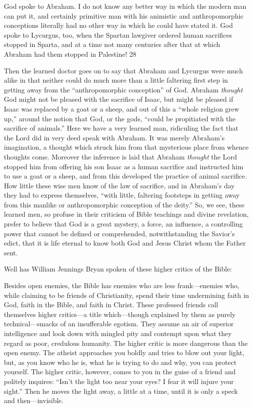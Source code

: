 God spoke to Abraham. I do not know any better way in which the modern man can put it,
and certainly primitive man with his animistic and anthropomorphic conceptions literally had
no other way in which he could have stated it. God spoke to Lycurgus, too, when the Spartan
lawgiver ordered human sacrifices stopped in Sparta, and at a time not many centuries after
that at which Abraham had them stopped in Palestine! 28

Then the learned doctor goes on to say that Abraham and Lycurgus were much alike in that
neither could do much more than a little faltering first step in getting away from the
``anthropomorphic conception'' of God. Abraham \textit{thought} God might not be pleased with the
sacrifice of Isaac, but might be pleased if Isaac was replaced by a goat or a sheep, and out of
this a ``whole religion grew up,'' around the notion that God, or the gods, ``could be
propitiated with the sacrifice of animals.'' Here we have a very learned man, ridiculing the
fact that the Lord did in very deed speak with Abraham. It was merely Abraham's
imagination, a thought which struck him from that mysterious place from whence thoughts
come. Moreover the inference is laid that Abraham \textit{thought} the Lord stopped him from
offering his son Isaac as a human sacrifice and instructed him to use a goat or a sheep, and
from this developed the practice of animal sacrifice. How little these wise men know of the
law of sacrifice, and in Abraham's day they had to express themselves, ``with little, faltering
footsteps in getting away from this manlike or anthropomorphic conception of the deity.'' So,
we see, these learned men, so profuse in their criticism of Bible teachings and divine
revelation, prefer to believe that God is a great mystery, a force, an influence, a controlling
power that cannot be defined or comprehended, notwithstanding the Savior's edict, that it is
life eternal to know both God and Jesus Christ whom the Father sent.

Well has William Jennings Bryan spoken of these higher critics of the Bible:

Besides open enemies, the Bible has enemies who are less frank—enemies who, while
claiming to be friends of Christianity, spend their time undermining faith in God, faith in the
Bible, and faith in Christ. These professed friends call themselves higher critics—a title
which—though explained by them as purely technical—smacks of an insufferable egotism.
They assume an air of superior intelligence and look down with mingled pity and contempt
upon what they regard as poor, credulous humanity. The higher critic is more dangerous than
the open enemy. The atheist approaches you boldly and tries to blow out your light, but, as
you know who he is, what he is trying to do and why, you can protect yourself. The higher
critic, however, comes to you in the guise of a friend and politely inquires: ``Isn't the light too
near your eyes? I fear it will injure your sight.'' Then he moves the light away, a little at a
time, until it is only a speck and then—invisible.

